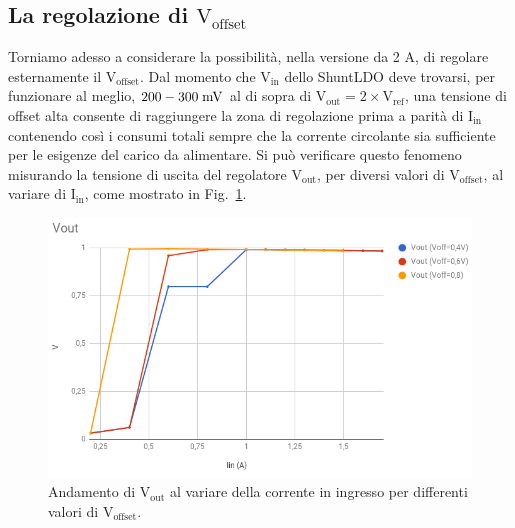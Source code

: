 \subsection{La regolazione di  $\mathrm{V_{offset}}$}
\label{Voffset}

Torniamo adesso a considerare la possibilità, nella versione da 2 A, di regolare esternamente il $\mathrm{V_{offset}}$. 
Dal momento che $\mathrm{V_{in}}$ dello ShuntLDO deve trovarsi, per funzionare al meglio, $200-300\rm \; mV$ al di sopra di $\mathrm{V_{out}=2\times V_{ref}}$, una tensione di offset alta consente di raggiungere la zona di regolazione prima a parit\`a di $\mathrm{I_{in}}$ contenendo cos\`i i consumi totali sempre che la corrente circolante sia sufficiente per le esigenze del carico da alimentare.
Si può verificare questo fenomeno misurando la tensione di uscita del regolatore $\mathrm{V_{out}}$, per diversi valori di $\mathrm{V_{offset}}$, al variare di $\mathrm{I_{in}}$, come mostrato in Fig.~\ref{VoutVsVoffset}.
\begin{figure}
\centering
\includegraphics[scale=.4]{Immagini/VoutVsVoffset}
\caption{Andamento di $\mathrm{V_{out}}$ al variare della corrente in ingresso per differenti valori di $\mathrm{V_{offset}}$.}
\label{VoutVsVoffset}
\end{figure}

